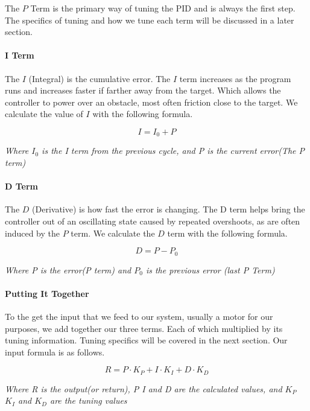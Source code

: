 \documentclass[12pt]{report}
\begin{document}
    The $P$ Term is the primary way of tuning the PID and is always the first step.
    The specifics of tuning and how we tune each term will be discussed in a later section.

\paragraph{I Term}
    The $I$ (Integral) is the cumulative error.
    The $I$ term increases as the program runs and increases faster if farther away from the target. 
    Which allows the controller to power over an obstacle, most often friction close to the target.
    We calculate the value of $I$ with the following formula.

    $$ I = I_0 + P$$
    \begin{center}\em{Where $I_0$ is the I term from the previous cycle, and P is the current error(The P term)}\end{center}

\paragraph{D Term}
    The $D$ (Derivative) is how fast the error is changing.
    The D term helps bring the controller out of an oscillating state caused by repeated overshoots, 
        as are often induced by the $P$ term. We calculate the $D$ term with the following formula.

    $$D = P - P_0$$
    \begin{center}\em{Where P is the error(P term) and $P_0$ is the previous error (last P Term)}\end{center}

\paragraph{Putting It Together}
    To the get the input that we feed to our system,
        usually a motor for our purposes, we add together our three terms.
    Each of which multiplied by its tuning information.
    Tuning specifics will be covered in the next section. 
    Our input formula is as follows.

    $$ R = P \cdot K_P + I \cdot K_I + D \cdot K_D$$
    \begin{center}
        \em{Where R is the output(or return), 
            P I and D are the calculated values, 
            and $K_P$ $K_I$ and $K_D$ are the tuning values
        }
    \end{center}
\end{document}
